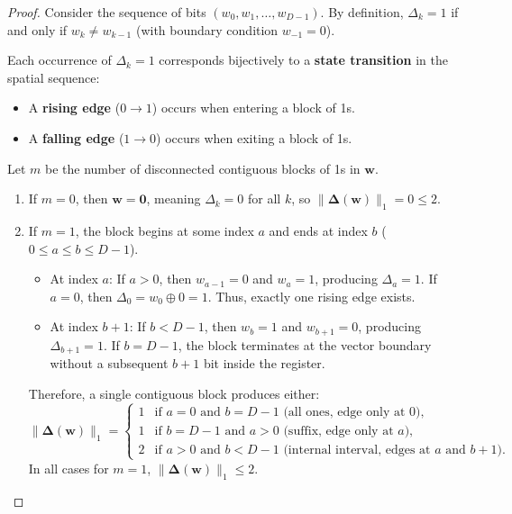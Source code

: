 \documentclass[11pt,a4paper]{article}
\theoremstyle{definition}
\begin{document}
\begin{proof}
Consider the sequence of bits $(w_0, w_1, \dots, w_{D-1})$. By definition, $\Delta_k = 1$ if and only if $w_k \ne w_{k-1}$ (with boundary condition $w_{-1} = 0$).

Each occurrence of $\Delta_k = 1$ corresponds bijectively to a \textbf{state transition} in the spatial sequence:
\begin{itemize}
    \item A \textbf{rising edge} ($0 \to 1$) occurs when entering a block of 1s.
    \item A \textbf{falling edge} ($1 \to 0$) occurs when exiting a block of 1s.
\end{itemize}

Let $m$ be the number of disconnected contiguous blocks of 1s in $\mathbf{w}$.
\begin{enumerate}
    \item If $m = 0$, then $\mathbf{w} = \mathbf{0}$, meaning $\Delta_k = 0$ for all $k$, so $\|\bm{\Delta}(\mathbf{w})\|_1 = 0 \le 2$.
    \item If $m = 1$, the block begins at some index $a$ and ends at index $b$ ($0 \le a \le b \le D-1$).
    \begin{itemize}
        \item At index $a$: If $a > 0$, then $w_{a-1} = 0$ and $w_a = 1$, producing $\Delta_a = 1$. If $a = 0$, then $\Delta_0 = w_0 \oplus 0 = 1$. Thus, exactly one rising edge exists.
        \item At index $b + 1$: If $b < D-1$, then $w_b = 1$ and $w_{b+1} = 0$, producing $\Delta_{b+1} = 1$. If $b = D-1$, the block terminates at the vector boundary without a subsequent $b+1$ bit inside the register.
    \end{itemize}
    Therefore, a single contiguous block produces either:
    \begin{equation}
        \|\bm{\Delta}(\mathbf{w})\|_1 = \begin{cases}
            1 & \text{if } a = 0 \text{ and } b = D-1 \text{ (all ones, edge only at 0)}, \\
            1 & \text{if } b = D-1 \text{ and } a > 0 \text{ (suffix, edge only at } a), \\
            2 & \text{if } a > 0 \text{ and } b < D-1 \text{ (internal interval, edges at } a \text{ and } b+1).
        \end{cases}
    \end{equation}
    In all cases for $m = 1$, $\|\bm{\Delta}(\mathbf{w})\|_1 \le 2$.

\end{enumerate}
\end{proof}
\end{document}
